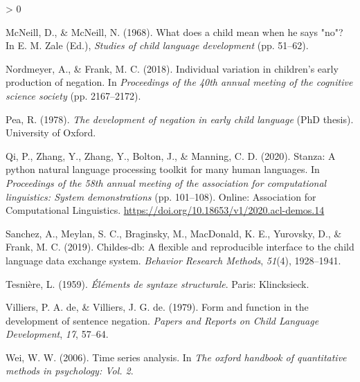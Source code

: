 \documentclass[
  english,
  man,floatsintext]{apa6}
\newlength{\cslhangindent}
\newenvironment{CSLReferences}[2] %
 {%
  \setlength{\parindent}{0pt}
  \ifodd #1 \everypar{\setlength{\hangindent}{\cslhangindent}}\ignorespaces\fi
  \ifnum #2 > 0
  \setlength{\parskip}{#2\baselineskip}
  \fi
 }%
 {}
\begin{document}
\begin{CSLReferences}{1}{0}
\leavevmode\hypertarget{ref-mcneill1968}{}%
McNeill, D., \& McNeill, N. (1968). What does a child mean when he says "no"? In E. M. Zale (Ed.), \emph{Studies of child language development} (pp. 51--62).

\leavevmode\hypertarget{ref-nordmeyer2018individual}{}%
Nordmeyer, A., \& Frank, M. C. (2018). Individual variation in children's early production of negation. In \emph{Proceedings of the 40th annual meeting of the cognitive science society} (pp. 2167--2172).

\leavevmode\hypertarget{ref-pea1978}{}%
Pea, R. (1978). \emph{The development of negation in early child language} (PhD thesis). University of Oxford.

\leavevmode\hypertarget{ref-qi-etal-2020-stanza}{}%
Qi, P., Zhang, Y., Zhang, Y., Bolton, J., \& Manning, C. D. (2020). {S}tanza: A python natural language processing toolkit for many human languages. In \emph{Proceedings of the 58th annual meeting of the association for computational linguistics: System demonstrations} (pp. 101--108). Online: Association for Computational Linguistics. \url{https://doi.org/10.18653/v1/2020.acl-demos.14}

\leavevmode\hypertarget{ref-sanchez2019childes}{}%
Sanchez, A., Meylan, S. C., Braginsky, M., MacDonald, K. E., Yurovsky, D., \& Frank, M. C. (2019). Childes-db: A flexible and reproducible interface to the child language data exchange system. \emph{Behavior Research Methods}, \emph{51}(4), 1928--1941.

\leavevmode\hypertarget{ref-dg}{}%
Tesnière, L. (1959). \emph{{É}l{é}ments de syntaxe structurale}. Paris: Klincksieck.

\leavevmode\hypertarget{ref-de1979form}{}%
Villiers, P. A. de, \& Villiers, J. G. de. (1979). Form and function in the development of sentence negation. \emph{Papers and Reports on Child Language Development}, \emph{17}, 57--64.

\leavevmode\hypertarget{ref-wei2006time}{}%
Wei, W. W. (2006). Time series analysis. In \emph{The oxford handbook of quantitative methods in psychology: Vol. 2}.

\end{CSLReferences}
\end{document}
